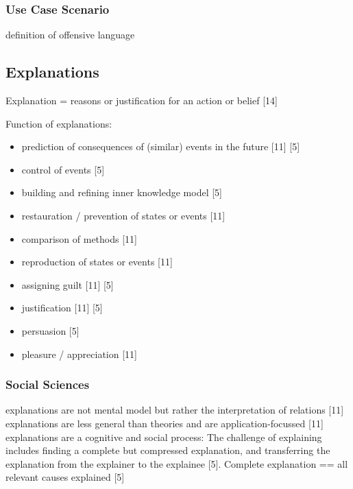 \subsubsection{Use Case Scenario}
definition of offensive language 



\subsection{Explanations}
Explanation = reasons or justification for an action or belief [14]\newline

Function of explanations:\newline
\begin{itemize}
	\item prediction of consequences of (similar) events in the future [11] [5]
	\item control of events  [5]
	\item building and refining inner knowledge model [5]
	\item restauration / prevention of states or events [11]
	\item comparison of methods [11]
	\item reproduction of states or events [11]
	\item assigning guilt [11] [5]
	\item justification [11] [5]
	\item persuasion [5]
	\item pleasure / appreciation [11]
\end{itemize}

\subsubsection{Social Sciences}
explanations are not mental model but rather the interpretation of relations [11]\newline
explanations are less general than theories and are application-focussed [11] \newline
explanations are a cognitive and social process: The challenge of explaining includes finding a complete but compressed explanation, and transferring the explanation from the explainer to the explainee [5].\newline
Complete explanation == all relevant causes explained [5] \newline

